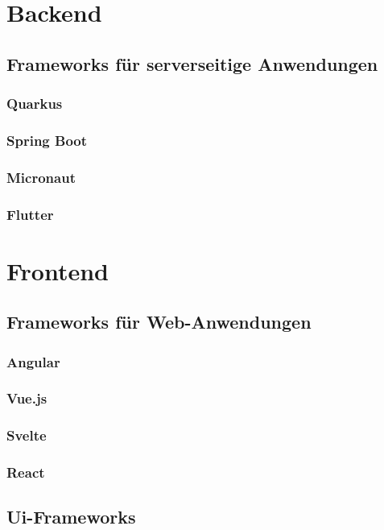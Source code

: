 \section{Backend}

\subsection{Frameworks für serverseitige Anwendungen}
\subsubsection{Quarkus}
\subsubsection{Spring Boot}
\subsubsection{Micronaut}
\subsubsection{Flutter}

\section{Frontend}

\subsection{Frameworks für Web-Anwendungen}
\subsubsection{Angular}
\subsubsection{Vue.js}
\subsubsection{Svelte}
\subsubsection{React}

\subsection{Ui-Frameworks} 
